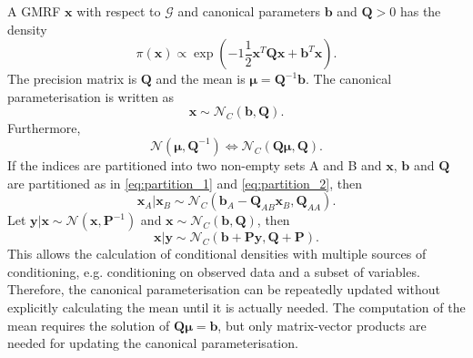\documentclass[12pt]{book}
\begin{document}
A GMRF $\pmb{x}$ with respect to $\mathcal{G}$ and canonical parameters $\pmb{b}$ and $\pmb{Q}>0$ has the density
\begin{equation*}
    \pi\left(\pmb{x}\right)\propto\exp\left(-1\frac{1}{2}\pmb{x}^T\pmb{Q}\pmb{x}+\pmb{b}^T\pmb{x}\right).
\end{equation*}
The precision matrix is $\pmb{Q}$ and the mean is $\pmb{\mu}=\pmb{Q}^{-1}\pmb{b}$. The canonical parameterisation is written as 
\begin{equation*}
    \pmb{x}\sim \mathcal{N}_C\left(\pmb{b},\pmb{Q}\right).
\end{equation*}
Furthermore,
\begin{equation*}
    \mathcal{N}\left(\pmb{\mu},\pmb{Q}^{-1}\right) \Longleftrightarrow \mathcal{N}_C\left(\pmb{Q\mu}, \pmb{Q}\right).
\end{equation*}
If the indices are partitioned into two non-empty sets A and B and $\pmb{x}$, $\pmb{b}$ and $\pmb{Q}$ are partitioned as in \eqref{eq:partition_1} and \eqref{eq:partition_2}, then
\begin{equation}
    \pmb{x}_A|\pmb{x}_B\sim\mathcal{N}_C\left(\pmb{b}_A-\pmb{Q}_{AB}\pmb{x}_B,\pmb{Q}_{AA}\right).
\end{equation}
Let $\pmb{y}|\pmb{x}\sim\mathcal{N}\left(\pmb{x},\pmb{P}^{-1}\right)$ and $\pmb{x}\sim\mathcal{N}_C\left(\pmb{b},\pmb{Q}\right)$, then
\begin{equation}
    \pmb{x}|\pmb{y}\sim\mathcal{N}_C\left(\pmb{b}+\pmb{Py}, \pmb{Q}+\pmb{P}\right).
\end{equation}
This allows the calculation of conditional densities with multiple sources of conditioning, e.g. conditioning on observed data and a subset of variables. Therefore, the canonical parameterisation can be repeatedly updated without explicitly calculating the mean until it is actually needed. The computation of the mean requires the solution of $\pmb{Q\mu}=\pmb{b}$, but only matrix-vector products are needed for updating the canonical parameterisation.
\end{document}
